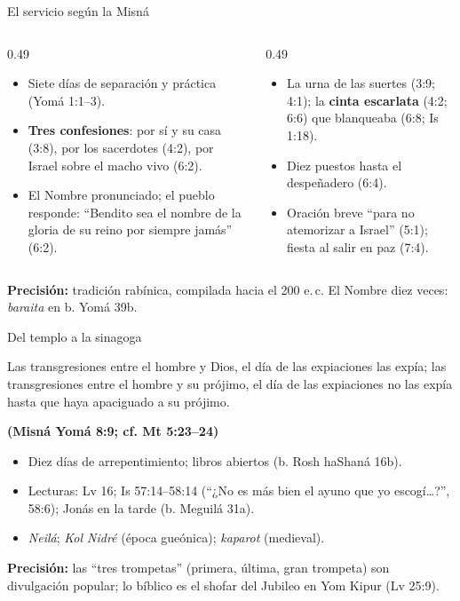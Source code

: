 \documentclass[hyperref={bookmarks=false},aspectratio=169]{beamer}
\newcommand{\fuente}[1]{\par\hfill{\upshape\bfseries\footnotesize\textcolor{tierraroja}{#1}}}
\newcommand{\destacar}[1]{\textbf{\textcolor{tierraroja}{#1}}}
\newcommand{\precision}[1]{{\footnotesize\color{sepia}\textbf{Precisión:} #1}}
\begin{document}
\begin{frame}{El servicio según la Misná}
\scriptsize
\begin{columns}[t,onlytextwidth]
\begin{column}{0.49\textwidth}
\begin{itemize}
\item Siete días de separación y práctica (Yomá 1:1--3).
\item \destacar{Tres confesiones}: por sí y su casa (3:8), por los sacerdotes (4:2), por Israel sobre el macho vivo (6:2).
\item El Nombre pronunciado; el pueblo responde: ``Bendito sea el nombre de la gloria de su reino por siempre jamás'' (6:2).
\end{itemize}
\end{column}
\begin{column}{0.49\textwidth}
\begin{itemize}
\item La urna de las suertes (3:9; 4:1); la \destacar{cinta escarlata} (4:2; 6:6) que blanqueaba (6:8; Is 1:18).
\item Diez puestos hasta el despeñadero (6:4).
\item Oración breve ``para no atemorizar a Israel'' (5:1); fiesta al salir en paz (7:4).
\end{itemize}
\end{column}
\end{columns}\par\medskip
\precision{tradición rabínica, compilada hacia el 200 e.\,c. El Nombre diez veces: \emph{baraita} en b. Yomá 39b.}
\end{frame}

\begin{frame}{Del templo a la sinagoga}
\begin{cita}[fontupper=\scriptsize\itshape]Las transgresiones entre el hombre y Dios, el día de las expiaciones las expía; las transgresiones entre el hombre y su prójimo, el día de las expiaciones no las expía hasta que haya apaciguado a su prójimo.\fuente{(Misná Yomá 8:9; cf. Mt 5:23--24)}\end{cita}
\scriptsize
\begin{itemize}\setlength{\itemsep}{1pt}
\item Diez días de arrepentimiento; libros abiertos (b. Rosh haShaná 16b).
\item Lecturas: Lv 16; Is 57:14--58:14 (``¿No es más bien el ayuno que yo escogí\ldots?'', 58:6); Jonás en la tarde (b. Meguilá 31a).
\item \emph{Neilá}; \emph{Kol Nidré} (época gueónica); \emph{kaparot} (medieval).
\end{itemize}
\precision{las ``tres trompetas'' (primera, última, gran trompeta) son divulgación popular; lo bíblico es el shofar del Jubileo en Yom Kipur (Lv 25:9).}
\end{frame}
\end{document}

